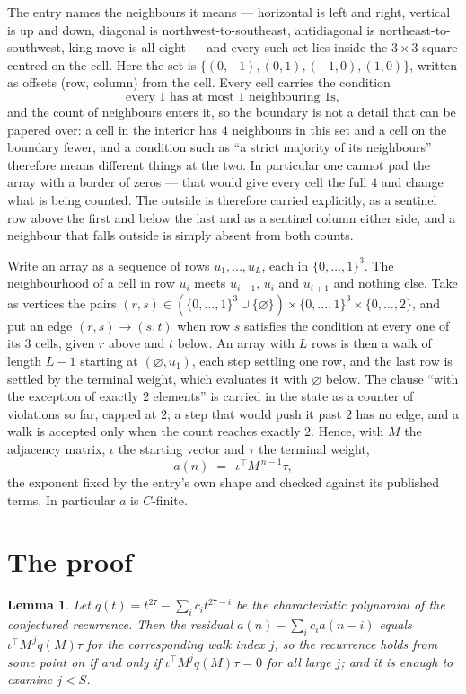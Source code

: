 \documentclass[11pt,a4paper]{article}
\theoremstyle{plain}
\newtheorem{lemma}[theorem]{Lemma}
\theoremstyle{definition}
\begin{document}
The entry names the neighbours it means --- horizontal is left and right, vertical is up and
down, diagonal is northwest-to-southeast, antidiagonal is northeast-to-southwest, king-move is
all eight --- and every such set lies inside the $3\times3$ square centred on the cell. Here
the set is $\{(0,-1), (0,1), (-1,0), (1,0)\}$, written as offsets (row, column) from the cell. Every cell carries
the condition
\[
\text{every 1 has at most 1 neighbouring 1s},
\]
and the count of neighbours enters it, so the boundary is not a detail that can be papered
over: a cell in the interior has $4$ neighbours in this set and a cell on the boundary
fewer, and a condition such as ``a strict majority of its neighbours'' therefore means
different things at the two. In particular one cannot pad the array with a border of zeros ---
that would give every cell the full $4$ and change what is being counted. The outside is
therefore carried
explicitly, as a sentinel row above the first and below the last and as a sentinel column
either side, and a neighbour that falls outside is simply absent from both counts.

Write an array as a sequence of rows $u_1,\dots,u_L$, each in
$\{0,\dots,1\}^{3}$. The neighbourhood of a cell in row $u_i$ meets $u_{i-1}$,
$u_i$ and $u_{i+1}$ and nothing else. Take as vertices the pairs
$(r,s)\in(\{0,\dots,1\}^{3}\cup\{\varnothing\})\times\{0,\dots,1\}^{3} \times \{0,\dots,2\}$,
and put an edge $(r,s)\to(s,t)$ when row $s$ satisfies the condition at every one of its
$3$ cells, given $r$ above and $t$ below. An array with $L$ rows is then a walk of length
$L-1$ starting at $(\varnothing,u_1)$, each step settling one row, and the last row is
settled by the terminal weight, which evaluates it with $\varnothing$ below. The clause ``with the exception of exactly $2$ elements'' is carried in
the state as a counter of violations so far, capped at $2$; a step that would push it past
$2$ has no edge, and a walk is accepted only when the count reaches exactly $2$. Hence,
with $M$ the adjacency matrix, $\iota$ the starting vector and $\tau$ the terminal weight,
\[
a(n)\;=\;\,\iota^{\!\top}M^{\,n-1}\tau ,
\]
the exponent fixed by the entry's own shape and checked against its published terms. In
particular $a$ is $C$-finite.

\section{The proof}

\begin{lemma}\label{lem:crit}
Let $q(t)=t^{27}-\sum_i c_it^{27-i}$ be the characteristic polynomial of the
conjectured recurrence. Then the residual $a(n)-\sum_ic_ia(n-i)$ equals
$\iota^{\!\top}M^{\,j}q(M)\tau$ for the corresponding walk index $j$, so the
recurrence holds from some point on if and only if $\iota^{\!\top}M^{j}q(M)\tau=0$ for all
large $j$; and it is enough to examine $j<S$.
\end{lemma}
\end{document}
